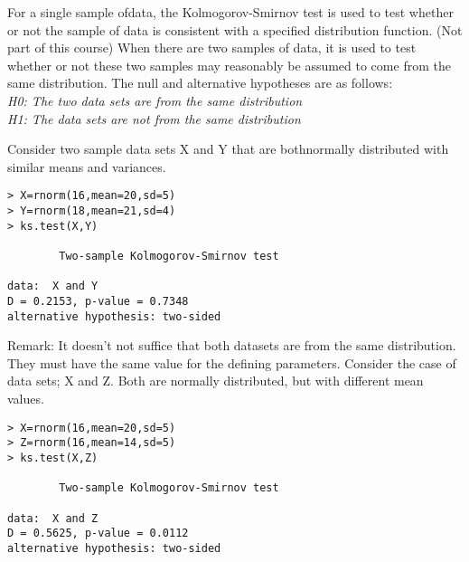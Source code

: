 \documentclass[a4paper,12pt]{article}
\begin{document}
For a single sample ofdata, the Kolmogorov-Smirnov test is used to test whether or not the sample of data is consistent with a specified distribution function. (Not part of this course)
When there are two samples of data, it is used to test whether or not these two samples may reasonably be assumed to come from the same distribution.
The null and alternative hypotheses are as follows:\\
\emph{
H0: The two data sets are from the same distribution\\
H1: The data sets are not from the same distribution\\
}

Consider two sample data sets X and Y that are bothnormally distributed with similar means and variances.
\begin{framed}
\begin{verbatim}
> X=rnorm(16,mean=20,sd=5)
> Y=rnorm(18,mean=21,sd=4)
> ks.test(X,Y)

        Two-sample Kolmogorov-Smirnov test

data:  X and Y
D = 0.2153, p-value = 0.7348
alternative hypothesis: two-sided
\end{verbatim}
\end{framed}
Remark: It doesn’t not suffice that both datasets are from the same distribution. They must have the same value for the defining parameters. Consider the case of data sets; X and Z. Both are normally distributed, but with different mean values.
\begin{framed}
\begin{verbatim}
> X=rnorm(16,mean=20,sd=5)
> Z=rnorm(16,mean=14,sd=5)
> ks.test(X,Z)

        Two-sample Kolmogorov-Smirnov test

data:  X and Z
D = 0.5625, p-value = 0.0112
alternative hypothesis: two-sided
\end{verbatim}
\end{framed}
\end{document}
